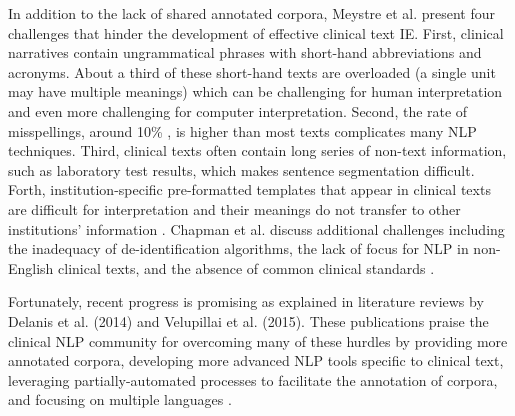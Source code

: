 \documentclass[sigconf]{acmart}
\begin{document}
In addition to the lack of shared annotated corpora, Meystre et al. present four challenges that hinder the development of effective clinical text IE. First, clinical narratives contain ungrammatical phrases with short-hand abbreviations and acronyms. About a third of these short-hand texts are overloaded (a single unit may have multiple meanings) which can be challenging for human interpretation and even more challenging for computer interpretation. Second, the rate of misspellings, around 10\% \cite{ruch2003using}, is higher than most texts complicates many NLP techniques. Third, clinical texts often contain long series of non-text information, such as laboratory test results, which makes sentence segmentation difficult. Forth, institution-specific pre-formatted templates that appear in clinical texts are difficult for interpretation and their meanings do not transfer to other institutions' information \cite{meystre2008extracting}. Chapman et al. discuss additional challenges including the inadequacy of de-identification algorithms, the lack of focus for NLP in non-English clinical texts, and the absence of common clinical standards \cite{chapman2011overcoming}.

Fortunately, recent progress is promising as explained in literature reviews by Delanis et al. (2014) and Velupillai et al. (2015). These publications praise the clinical NLP community for overcoming many of these hurdles by providing more annotated corpora, developing more advanced NLP tools specific to clinical text, leveraging partially-automated processes to facilitate the annotation of corpora, and focusing on multiple languages \cite{dalianis2014didactic} \cite{velupillai2015recent}.
\end{document}
